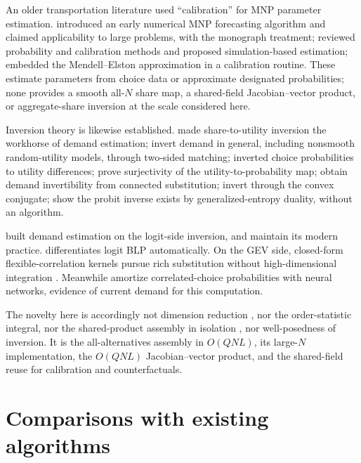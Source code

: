 \documentclass[12pt]{article}
\theoremstyle{remark}
\begin{document}
An older transportation literature used ``calibration'' for MNP
parameter estimation. \citet{daganzo1977} introduced an early numerical
MNP forecasting algorithm and claimed applicability to large problems,
with \citet{daganzo1979} the monograph treatment;
\citet{sheffi1982} reviewed probability and calibration methods and
proposed simulation-based estimation; \citet{kamakura1989} embedded the
Mendell--Elston approximation in a calibration routine. These estimate
parameters from choice data or approximate designated probabilities;
none provides a smooth all-$N$ share map, a shared-field
Jacobian--vector product, or aggregate-share inversion at the scale
considered here.

Inversion theory is likewise established. \citet{berry1994} made
share-to-utility inversion the workhorse of demand estimation;
\citet{bonnet2022} invert demand in general, including nonsmooth
random-utility models, through two-sided matching;
\citet{hotz1993}
inverted choice probabilities to utility differences; \citet{norets2013}
prove surjectivity of the utility-to-probability map;
\citet{bgh2013} obtain demand invertibility from
connected substitution;
\citet{chiong2016} invert through the convex
conjugate; \citet{fosgerau2020} show the probit inverse exists by
generalized-entropy duality, without an algorithm.

 \citet{berry1995} built demand
estimation on the logit-side inversion, and \citet{conlon2020}
maintain its modern practice. \citet{chia2021}
differentiates logit BLP automatically. On the GEV side, closed-form
flexible-correlation kernels pursue rich substitution without
high-dimensional integration \citep{tinessa2020,tinessa2021}.
Meanwhile \citet{huch2026}
amortize correlated-choice probabilities with neural networks, evidence of
current demand for this computation.

The novelty here is accordingly not dimension reduction
\citep{curnow1962}, nor the order-statistic integral, nor the
shared-product assembly in isolation \citep{mahani2019,cotton2021}, nor
well-posedness of inversion. It is the
all-alternatives assembly in $O(QNL)$, its large-$N$ implementation, the
$O(QNL)$ Jacobian--vector product, and the shared-field reuse for
calibration and counterfactuals.

\section{Comparisons with existing algorithms}\label{sec:comparisons}
\label{sec:boundary}
\end{document}
